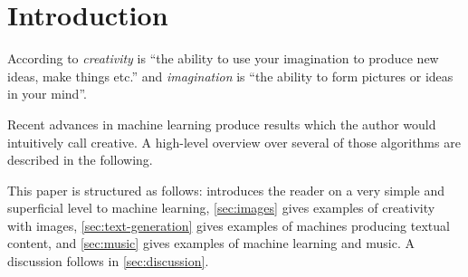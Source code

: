 
\section{Introduction}
\label{sec:introduction}
According to \cite{LongmanDCE06} \textit{creativity} is \enquote{the ability to
use your imagination to produce new ideas, make things etc.} and
\textit{imagination} is \enquote{the ability to form pictures or ideas in your
mind}.

Recent advances in machine learning produce results which the author would
intuitively call creative. A high-level overview over several of those
algorithms are described in the following.

This paper is structured as follows:  introduces the
reader on a very simple and superficial level to machine learning,
\cref{sec:images} gives examples of creativity with images,
\cref{sec:text-generation} gives examples of machines producing textual
content, and \cref{sec:music} gives examples of machine learning and music. A
discussion follows in
\cref{sec:discussion}.
